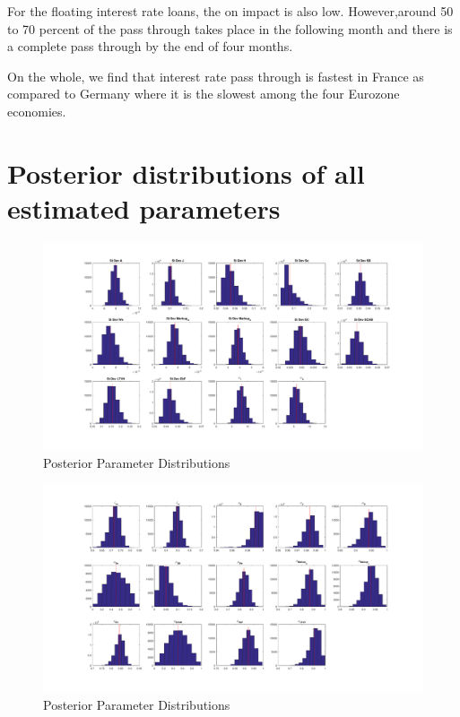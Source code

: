 \documentclass[12pt]{article}
\numberwithin{equation}{section}
\begin{document}
\begin{appendix}
For the floating interest rate loans, the on impact is also low. However,around 50 to 70 percent of the pass through takes place in the following month and there is a complete pass through by the end of four months.

On the whole, we find that interest rate pass through is fastest in France as compared to Germany where it is the slowest among the four Eurozone economies.

\section*{Posterior distributions of all estimated parameters}

\begin{figure}[h]
\caption{Posterior Parameter Distributions}
\includegraphics[scale=0.45]{posteriordistributions1.pdf}
\end{figure}

\begin{figure}[h]
\caption{Posterior Parameter Distributions}
\includegraphics[scale=0.45]{posteriordistributions2.pdf}
\end{figure}



\end{appendix}
\end{document}
